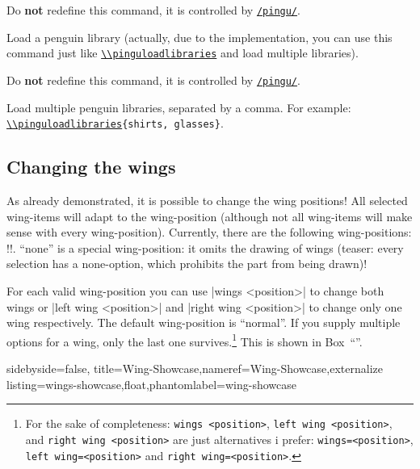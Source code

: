 \documentclass[parskip=half,english,numbers=noenddot,footnotes=nomultiple,oneside]{scrartcl}
\makeatletter
\let\say\enquote
\def\DTLlistformatitem#1{\textit{#1\expandafter\ParseDTLListElement :#1\@nil}}
\newcommand*\typesetselection[1][]{\begingroup\ifx!#1!\else\def\DTLlistformatitem##1{#1}\fi\dotypesetselection}
\def\dotypesetselection#1{\label{expl-list:#1}\def\CurrentList{#1}\expandafter\DTLformatlist\expandafter{\csname @pingu@#1@\endcsname}\endgroup}
\def\ipingu#1{\lstinline'#1'}
\def\lpingu#1{\lstinline[style=lstpingu,language=pingulang]'#1'}
\let\@explainsuff\@empty
\let\@labelhack\@empty
\newcommand*\keyref[2][/pingu/]{\hyperref[pk:#1#2]{\lpingu{#1#2}}}
\newcommand*\cmdref[1]{\hyperref[pk:/pingu/:bs:#1]{\lpingu{\\#1}}}
\newenvironment{commandexplain}[3][]{%
\begingroup
\def\@labelhack{/pingu/}%
\def\mand##1{\texttt{\{\textsf{\smaller##1}\}}}%
\def\@pingu@command@keypartner{#1}%
\newcommand\opt[2][]{\texttt{\textit{[\textsf{\smaller##2\ifx!##1!\else\textcolor{gray}{\smaller\sffamily=##1}\fi}]}}}%
\def\@explainsuff{#3}%
\keyexplain[]{\\#2}{}{}%
\ifx\@pingu@command@keypartner\@empty\else
{\@declaredcolor{gray}\footnotesize Do \textbf{not} redefine this command, it is controlled by \keyref{#1}.}\par\fi
}{\endkeyexplain\endgroup}
\makeatother
\begin{document}
\begin{commandexplain}{pinguloadlibrary}{\mand{library}}
	Load a penguin library (actually, due to the implementation, you can use this command just like \cmdref{pinguloadlibraries} and load multiple libraries).
\end{commandexplain}

\begin{commandexplain}{pinguloadlibraries}{\mand{libraries}}
	Load multiple penguin libraries, separated by a comma. For example: \texttt{\cmdref{pinguloadlibraries}\{shirts, glasses\}}.
\end{commandexplain}

\subsection{Changing the wings}
\label{subsec:wings}As already demonstrated, it is possible to change the wing positions!
All selected wing-items will adapt to the wing-position (although not all wing-items will make sense with every wing-position).
Currently, there are the following wing-positions:
\typesetselection{leftwing}. \say{none} is a special wing-position: it omits the drawing of wings (teaser: every selection has a none-option, which prohibits the part from being drawn)!

For each valid wing-position you can use |wings <position>| to change both wings or |left wing <position>| and |right wing <position>| to change only one wing respectively. The default wing-position is \say{normal}. If you supply multiple options for a wing, only the last one survives.\footnote{For the sake of completeness: \ipingu{wings <position>}, \ipingu{left wing <position>}, and \ipingu{right wing <position>} are just alternatives i prefer: \ipingu{wings=<position>}, \ipingu{left wing=<position>} and \ipingu{right wing=<position>}.}
This is shown in Box~\say{}.

\begin{tcblisting}{sidebyside=false, title=Wing-Showcase,nameref=Wing-Showcase,externalize listing=wings-showcase,float,phantomlabel=wing-showcase}
\begin{tikzpicture}
	\pingu[left wing none, heart=green]
	\pingu[wings wave, heart=teal, xshift=3.5cm]
	\pingu[wings hug, heart=orange, xshift=7cm]
	\pingu[left wing grab, right wing shock, heart=purple, xshift=10.5cm]
\end{tikzpicture}
\end{tcblisting}
\end{document}
